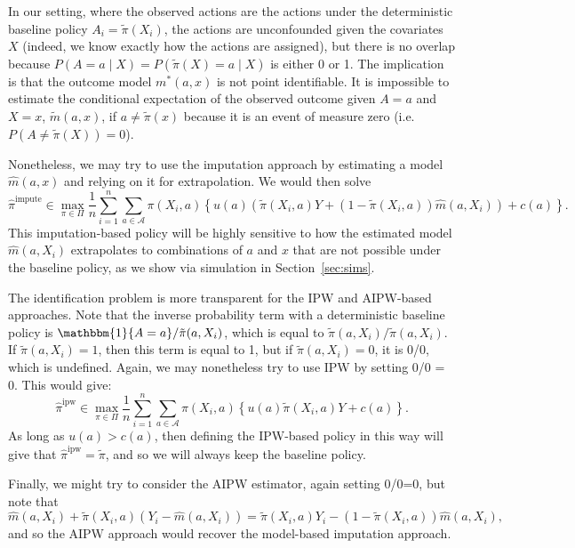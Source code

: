 \documentclass[12pt]{article}
\theoremstyle{definition}
\newcommand{\bbone}{\ensuremath{\mathbbm{1}}}
\newcommand{\<}{\langle}
\renewcommand{\>}{\rangle}
\begin{document}
In our setting, where the observed actions are the actions under the
deterministic baseline policy $A_i = \tilde{\pi}(X_i)$, the actions are
unconfounded given the covariates $X$ (indeed, we know exactly how the actions
are assigned), but there is no overlap because
$P(A = a \mid X) = P(\tilde{\pi}(X) = a \mid X)$ is either 0 or 1.
The implication is that the outcome model $m^\ast(a, x)$ is not point
identifiable. It is impossible to estimate the conditional
expectation of the observed outcome given $A = a$ and $X = x$,
$\tilde{m}(a,x)$, if $a \neq \tilde{\pi}(x)$ because it is an event of measure
zero (i.e. $P(A \neq \tilde{\pi}(X)) = 0$).

Nonetheless, we may try to use the imputation approach by estimating a model
$\hat{m}(a,x)$ and relying on it for extrapolation. We would then solve
\begin{equation}
  \label{eq:impute_estimator}
  \hat{\pi}^\text{impute} \in \max_{\pi \in \Pi} \frac{1}{n}\sum_{i=1}^n \sum_{a \in \mathcal{A}}\pi(X_i, a)\left\{u(a) \left(\tilde{\pi}(X_i, a) Y + (1 - \tilde{\pi}(X_i, a))\hat{m}(a, X_i)\right) +c(a)\right\}.
\end{equation}
This imputation-based policy will be highly sensitive to how the estimated
model $\hat{m}(a, X_i)$ extrapolates to combinations of $a$ and $x$ that are
not possible under the baseline policy, as we show via simulation
in Section~\ref{sec:sims}.

The identification problem is more transparent for the IPW and AIPW-based
approaches. Note that the inverse probability term with a deterministic baseline
policy is $\bbone\{A = a\}/\tilde{\pi}(a, X_i)$, which is equal to
$\tilde{\pi}(a, X_i)/\tilde{\pi}(a, X_i)$. If $\tilde{\pi}(a,X_i) = 1$,
then this term is equal to 1, but if $\tilde{\pi}(a,X_i) = 0$, it is 0/0,
which is undefined. Again, we may nonetheless try to use IPW by setting 0/0 = 0.
This would give:
\[
  \hat{\pi}^\text{ipw} \in \max_{\pi \in \Pi} \frac{1}{n}\sum_{i=1}^n \sum_{a \in \mathcal{A}}\pi(X_i, a)\left\{u(a) \tilde{\pi}(X_i, a) Y  + c(a)\right\}.
\]
As long as $u(a) > c(a)$, then defining the IPW-based policy in this way will
give that $\hat{\pi}^\text{ipw}  = \tilde{\pi}$, and so we will always keep
the baseline policy.

Finally, we might try to consider the AIPW estimator, again setting 0/0=0, but
note that 
\[
\hat{m}(a, X_i) + \tilde{\pi}(X_i, a) (Y_i - \hat{m}(a, X_i)) = \tilde{\pi}(X_i, a) Y_i - (1-\tilde{\pi}(X_i, a)) \hat{m}(a, X_i),
\]
and so the AIPW approach would recover the model-based imputation approach.
\end{document}
